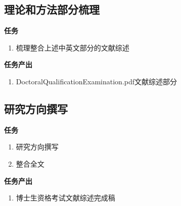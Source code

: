 \documentclass[
  12pt,
]{ctexart}
\providecommand{\tightlist}{%
  \setlength{\itemsep}{0pt}\setlength{\parskip}{0pt}}
\begin{document}
\hypertarget{ux7406ux8bbaux548cux65b9ux6cd5ux90e8ux5206ux68b3ux7406}{%
\subsection{理论和方法部分梳理}\label{ux7406ux8bbaux548cux65b9ux6cd5ux90e8ux5206ux68b3ux7406}}

\textbf{任务}

\begin{enumerate}
\def\labelenumi{\arabic{enumi}.}
\tightlist
\item
  梳理整合上述中英文部分的文献综述
\end{enumerate}

\textbf{任务产出}

\begin{enumerate}
\def\labelenumi{\arabic{enumi}.}
\tightlist
\item
  DoctoralQualificationExamination.pdf文献综述部分
\end{enumerate}

\hypertarget{ux7814ux7a76ux65b9ux5411ux64b0ux5199}{%
\subsection{研究方向撰写}\label{ux7814ux7a76ux65b9ux5411ux64b0ux5199}}

\textbf{任务}

\begin{enumerate}
\def\labelenumi{\arabic{enumi}.}
\item
  研究方向撰写
\item
  整合全文
\end{enumerate}

\textbf{任务产出}

\begin{enumerate}
\def\labelenumi{\arabic{enumi}.}
\tightlist
\item
  博士生资格考试文献综述完成稿
\end{enumerate}
\end{document}
